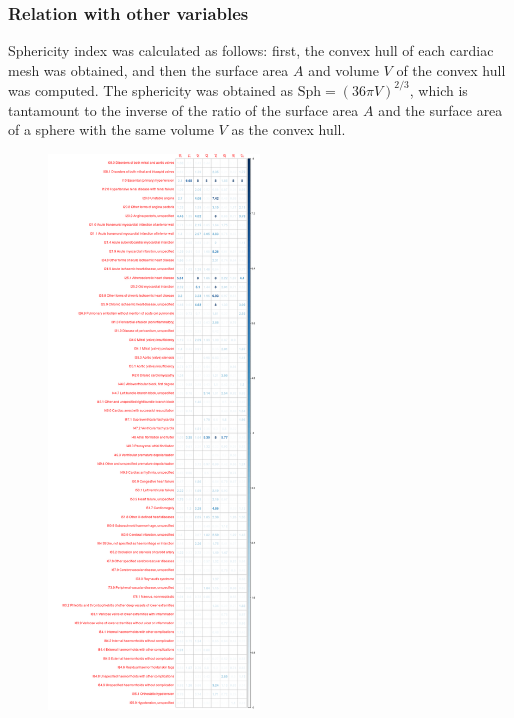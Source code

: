 \documentclass[fleqn,10pt]{wlscirep}
\begin{document}
\subsubsection{Relation with other variables}

Sphericity index was calculated as follows: first, the convex hull of each cardiac mesh was obtained, and then the surface area $A$ and volume $V$ of the convex hull was computed. The sphericity was obtained as $\text{Sph}=(36\pi V)^{2/3}$, which is tantamount to the inverse of the ratio of the surface area $A$ and the surface area of a sphere with the same volume $V$ as the convex hull.

\begin{figure}
\includegraphics[width=0.5\textwidth]{figs/diseases/experiment_1_health_outcome_t-test}

\end{figure}
\end{document}
